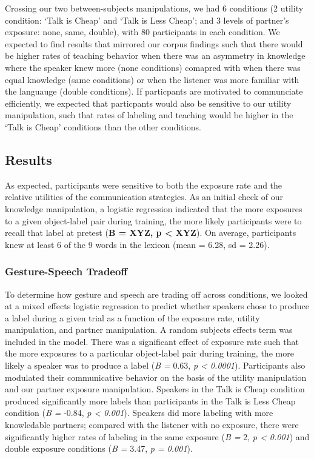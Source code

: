 \documentclass[10pt, letterpaper]{article}
\begin{document}
Crossing our two between-subjects manipulations, we had 6 conditions (2
utility condition: `Talk is Cheap' and `Talk is Less Cheap'; and 3
levels of partner's exposure: none, same, double), with 80 participants
in each condition. We expected to find results that mirrored our corpus
findings such that there would be higher rates of teaching behavior when
there was an asymmetry in knowledge where the speaker knew more (none
conditions) comapred with when there was equal knowledge (same
conditions) or when the listener was more familiar with the languauge
(double conditions). If particpants are motivated to communciate
efficiently, we expected that particpants would also be sensitive to our
utility manipulation, such that rates of labeling and teaching would be
higher in the `Talk is Cheap' conditions than the other conditions.

\hypertarget{results-1}{%
\subsection{Results}\label{results-1}}

As expected, participants were sensitive to both the exposure rate and
the relative utilities of the communication strategies. As an initial
check of our knowledge manipulation, a logistic regression indicated
that the more exposures to a given object-label pair during training,
the more likely participants were to recall that label at pretest
(\textbf{B = XYZ, p \textless{} XYZ}). On average, participants knew at
least 6 of the 9 words in the lexicon (mean = 6.28, sd = 2.26).

\hypertarget{gesture-speech-tradeoff}{%
\subsubsection{Gesture-Speech Tradeoff}\label{gesture-speech-tradeoff}}

To determine how gesture and speech are trading off across conditions,
we looked at a mixed effects logistic regression to predict whether
speakers chose to produce a label during a given trial as a function of
the exposure rate, utility manipulation, and partner manipulation. A
random subjects effects term was included in the model. There was a
significant effect of exposure rate such that the more exposures to a
particular object-label pair during training, the more likely a speaker
was to produce a label (\emph{B =} 0.63, \emph{p \textless{} 0.0001}).
Participants also modulated their communicative behavior on the basis of
the utility manipulation and our partner exposure manipulation. Speakers
in the Talk is Cheap condition produced significantly more labels than
participants in the Talk is Less Cheap condition (\emph{B =} -0.84,
\emph{p \textless{} 0.001}). Speakers did more labeling with more
knowledable partners; compared with the listener with no exposure, there
were significantly higher rates of labeling in the same exposure
(\emph{B =} 2, \emph{p \textless{} 0.001}) and double exposure
conditions (\emph{B =} 3.47, \emph{p = 0.001}).
\end{document}
